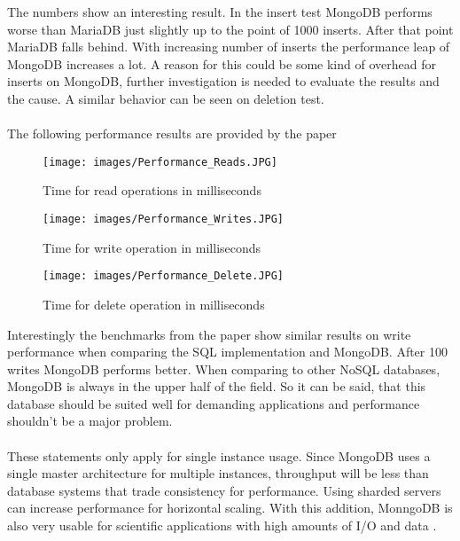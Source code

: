 The numbers show an interesting result. In the insert test MongoDB performs worse than MariaDB just slightly up to the point of 1000 inserts. After that point MariaDB falls behind. With increasing number of inserts the performance leap of MongoDB increases a lot. A reason for this could be some kind of overhead for inserts on MongoDB, further investigation is needed to evaluate the results and the cause. A similar behavior can be seen on deletion test.
\\\\
The following performance results are provided by the paper \cite{Li_A_2013}
\begin{figure}[H]
\texttt{[image: images/Performance\_Reads.JPG]}
\caption{Time for read operations in milliseconds}
\label{arch-example2}
\end{figure}
\begin{figure}[H]
\texttt{[image: images/Performance\_Writes.JPG]}
\caption{Time for write operation in milliseconds}
\label{arch-example3}
\end{figure}
\begin{figure}[H]
\texttt{[image: images/Performance\_Delete.JPG]}
\caption{Time for delete operation in milliseconds}
\label{arch-exampl1}
\end{figure}

Interestingly the benchmarks from the paper show similar results on write performance when comparing the SQL implementation and MongoDB. After 100 writes MongoDB performs better. When comparing to other NoSQL databases, MongoDB is always in the upper half of the field. So it can be said, that this database should be suited well for demanding applications and performance shouldn't be a major problem. 
\\\\
These statements only apply for single instance usage. Since MongoDB uses a single master architecture for multiple instances, throughput will be less than database systems that trade consistency for performance. Using sharded servers can increase performance for horizontal scaling. With this addition, MonngoDB is also very usable for scientific applications with high amounts of I/O and data \cite{Dede_Performance_2013}.



